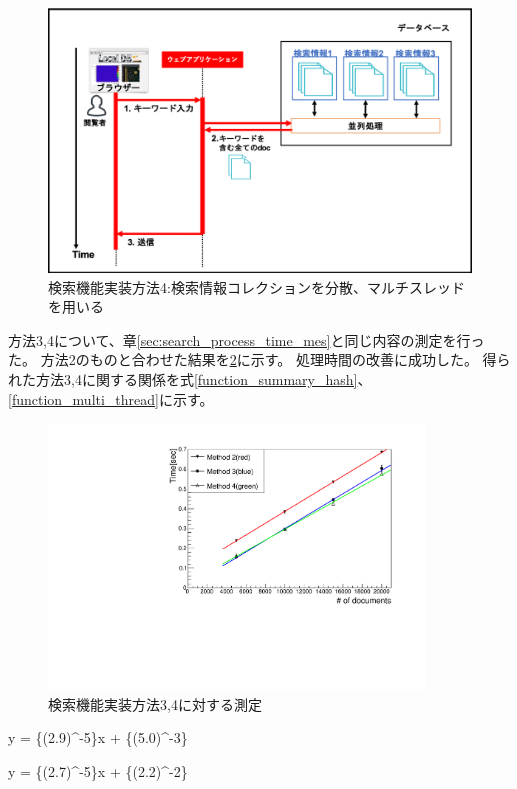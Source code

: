 \begin{figure}[bpt]
  \begin{center}
    \includegraphics[width=14cm]{search_multi_thread}
  \caption[検索機能実装方法4:検索情報コレクションを分散、マルチスレッドを用いる]{検索機能実装方法4:検索情報コレクションを分散、マルチスレッドを用いる}
  \label{search_multi_thread}
  \end{center}
\end{figure}

方法3,4について、章\ref{sec:search_process_time_mes}と同じ内容の測定を行った。
方法2のものと合わせた結果を\ref{searching_time_2}に示す。
処理時間の改善に成功した。
得られた方法3,4に関する関係を式\ref{function_summary_hash}、\ref{function_multi_thread}に示す。

\begin{figure}[bpt]
  \begin{center}
    \includegraphics[width=10cm,angle=270]{searching_time_2.pdf}
  \caption[検索機能実装方法3,4に対する測定]{検索機能実装方法3,4に対する測定}
  \label{searching_time_2}
  \end{center}
\end{figure}

\bbb
y = \{(2.9)^{-5}\}x + \{(5.0)^{-3}\}
\label{function_summary_hash}
\eee

\bbb
y = \{(2.7)^{-5}\}x + \{(2.2)^{-2}\}
\label{function_multi_thread}
\eee


